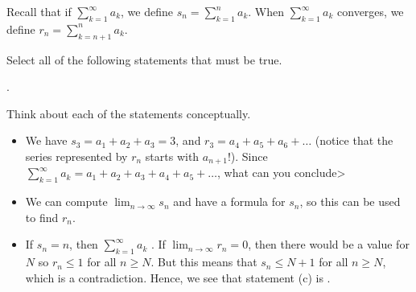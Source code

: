 \documentclass{ximera}
\author{Jim Talamo}
\begin{document}
\begin{exercise}

Recall that if $\sum_{k=1}^{\infty} a_k$, we define $s_n = \sum_{k=1}^n a_k$.  When $\sum_{k=1}^{\infty} a_k$ converges, we define $r_n = \sum_{k=n+1}^n a_k$. 

Select all of the following statements that must be true.

\begin{selectAll}
.
\end{selectAll}

\begin{hint}
Think about each of the statements conceptually.

\begin{itemize}
\item We have $s_3=a_1+a_2+a_3 = 3$, and $r_3 = a_4+a_5+a_6+\ldots$ (notice that the series represented by $r_n$ starts with $a_{n+1}$!).  Since $\sum_{k=1}^{\infty} a_k = a_1+a_2+a_3+a_4+a_5 + \ldots$, what can you conclude>

\item We can compute $\lim_{n \to \infty} s_n$ and have a formula for $s_n$, so this can be used to find $r_n$.

\item If $s_n=n$, then $\sum_{k=1}^{\infty} a_k$ .  If $\lim_{n \to \infty} r_n =0$, then there would be a value for $N$ so $r_n \leq 1$ for all $n \geq N$.  But this means that $s_n \leq N+1$ for all $n \geq N$, which is a contradiction.  Hence, we see that statement  (c) is .
\end{itemize}
\end{hint}
\end{exercise}
\end{document}
